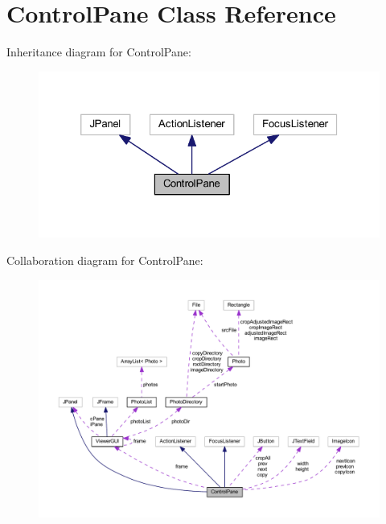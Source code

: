 \hypertarget{class_control_pane}{\section{Control\-Pane Class Reference}
\label{class_control_pane}
}


Inheritance diagram for Control\-Pane\-:
\nopagebreak
\begin{figure}[H]
\begin{center}
\leavevmode
\includegraphics[width=320pt]{class_control_pane__inherit__graph}
\end{center}
\end{figure}


Collaboration diagram for Control\-Pane\-:
\nopagebreak
\begin{figure}[H]
\begin{center}
\leavevmode
\includegraphics[width=350pt]{class_control_pane__coll__graph}
\end{center}
\end{figure}
